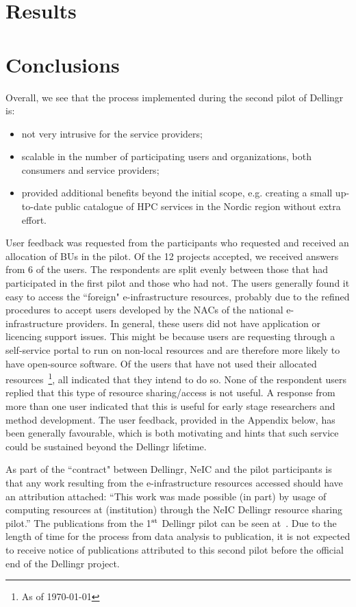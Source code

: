\documentclass{article}
\newcommand{\dell}{Dellingr\xspace}
\newcommand{\einfra}{e-infrastructure\xspace}
\begin{document}
\section{Results}
\label{sec:results}


\section{Conclusions}

Overall, we see that the process implemented during the second pilot of \dell is:
\begin{itemize}
\item not very intrusive for the service providers;
\item scalable in the number of participating users and organizations, both consumers and service providers;
\item provided additional benefits beyond the initial scope, e.g. creating a small up-to-date public catalogue of HPC services in the Nordic region without extra effort.
\end{itemize} 

User feedback was requested from the participants who requested and received an allocation of BUs in the pilot.
Of the 12 projects accepted, we received answers from 6 of the users.
The respondents are split evenly between those that had participated in the first pilot and those who had not.
The users generally found it easy to access the ``foreign" \einfra resources, probably due to the refined procedures to accept users developed by the NACs of the national \einfra providers.
In general, these users did not have application or licencing support issues.
This might be because users are requesting through a self-service portal to run on non-local resources and are therefore more likely to have open-source software.
Of the users that have not used their allocated resources~\footnote{As of \today}, all indicated that they intend to do so.
None of the respondent users replied that this type of resource sharing/access
is not useful.
A response from more than one user indicated that this is useful for early stage researchers and method development.
The user feedback, provided in the Appendix below, has been generally favourable, which is both motivating and hints that such service could be sustained beyond the \dell lifetime.

As part of the ``contract" between \dell, NeIC and the pilot participants is that any work resulting from the \einfra resources accessed should have an attribution attached: 
``This work was made possible (in part) by usage of computing resources at (institution) through the NeIC Dellingr resource sharing pilot.''
The publications from the 1$^{\rm st}$ \dell pilot can be seen at~\cite{pilot-pubs}.
Due to the length of time for the process from data analysis to publication, it is not expected to receive notice of publications attributed to this second pilot before the official end of the \dell project.
\end{document}
